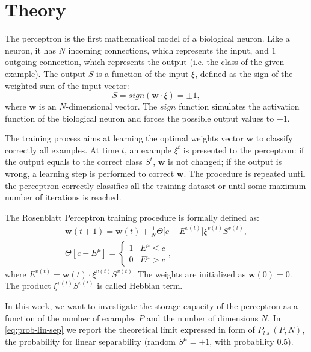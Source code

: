 \section{Theory}
\label{sec:fundamentals}

The perceptron is the first mathematical model of a biological neuron.
Like a neuron, it has $N$ incoming connections, which represents the input, and $1$ outgoing connection, which represents the output (i.e. the class of the given example).
The output $S$ is a function of the input $\xi$, defined as the sign of the weighted sum of the input vector:
\begin{equation}
    S = sign(\mathsf{\bm{w}} \cdotp \xi) = \pm 1,
    \label{eq:perceptron-activation}
\end{equation}
where $\mathsf{\bm{w}}$ is an $N$-dimensional vector.
The $sign$ function simulates the activation function of the biological neuron and forces the possible output values to $\pm 1$.

The training process aims at learning the optimal weights vector $\mathsf{\bm{w}}$ to classify correctly all examples.
At time $t$, an example $\xi^t$ is presented to the perceptron:
if the output equals to the correct class $S^t$, $\mathsf{\bm{w}}$ is not changed;
if the output is wrong, a learning step is performed to correct $\mathsf{\bm{w}}$.
The procedure is repeated until the perceptron correctly classifies all the training dataset or until some maximum number of iterations is reached.

The Rosenblatt Perceptron training procedure is formally defined as:
\begin{gather}
    \label{eq:perceptron-weight-update}
    \mathsf{\bm{w}}(t+1) = \mathsf{\bm{w}}(t) + \frac{1}{N} \Theta \big[c - E^{v(t)}\big] \xi^{v(t)} S^{v(t)}, \\
    \Theta[c - E^{\mu}] =  \begin{cases} \label{eq:heaviside-fun}
        1 & E^{\mu} \leq c \\
        0 & E^{\mu} > c
    \end{cases},
\end{gather}
where $E^{v(t)} = \mathsf{\bm{w}}(t) \cdot \xi^{v(t)} S^{v(t)}$.
The weights are initialized as $\mathsf{\bm{w}}(0) = 0$.
The product $\xi^{v(t)} S^{v(t)}$ is called Hebbian term.

In this work, we want to investigate the storage capacity of the perceptron as a function of the number of examples $P$ and the number of dimensions $N$.
In \cref{eq:prob-lin-sep} we report the theoretical limit expressed in form of $P_{l.s.}(P,N)$, the probability for linear separability (random $S^\mu = \pm 1$, with probability $0.5$).

